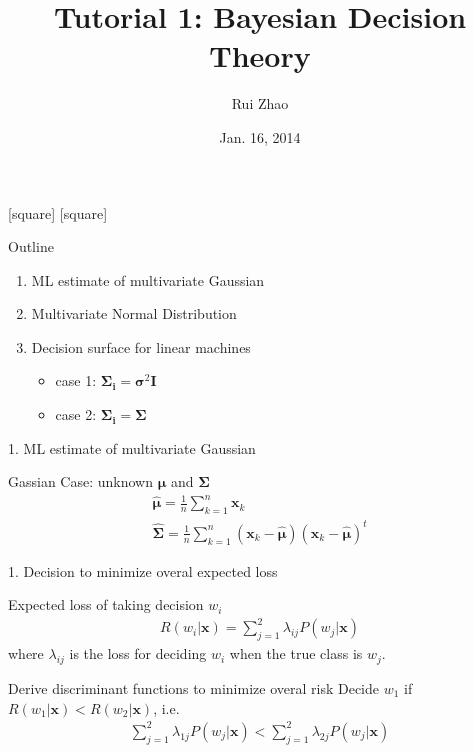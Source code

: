 \documentclass[compress,blue]{beamer}
\title[ENGG 5202 Pattern Recogntion Tutorial 1]{Tutorial 1: Bayesian Decision Theory}
\author{Rui Zhao}
\institute{rzhao@ee.cuhk.edu.hk}
\date{Jan. 16, 2014}
\newcommand{\bx}{\mathbf{x}}
\newcommand{\bmu}{\mathbf{\mu}}
\newcommand{\bSig}{\mathbf{\Sigma}}
\begin{document}
\begin{frame}
\titlepage
\end{frame}

[square]
[square]

\begin{frame}{Outline}
	\begin{enumerate}
		\item<1-> ML estimate of multivariate Gaussian 
		\vspace{0.1in}
		\item<2-> Multivariate Normal Distribution
		\vspace{0.1in}
		\item<3-> Decision surface for linear machines
		\begin{itemize}
			\item case 1: $\mathbf{\Sigma_i} = \mathbf{\sigma}^2\mathbf{I}$
			\item case 2: $\mathbf{\Sigma_i} = \mathbf{\Sigma}$
		\end{itemize}
	\end{enumerate}
\end{frame}

\begin{frame}{1. ML estimate of multivariate Gaussian}
	\begin{block}{Gassian Case: unknown $\bmu$ and $\bSig$}
		\begin{align}
			\hat{\bmu} = \frac{1}{n}\sum_{k=1}^n\bx_k\\
			\hat{\bSig} = \frac{1}{n}\sum_{k=1}^n(\bx_k - \hat{\bmu})(\bx_k - \hat{\bmu})^t
		\end{align}
	\end{block}
\end{frame}

\begin{frame}{1. Decision to minimize overal expected loss}
	\begin{block}{Expected loss of taking decision $w_i$}
		\vspace{-0.15in}
		\begin{align}
			R(w_i|\mathbf{x}) = \sum_{j=1}^2 \lambda_{ij} P(w_j | \mathbf{x})
		\end{align}
		where $\lambda_{ij}$ is the loss for deciding $w_i$ when the true class is $w_j$.
	\end{block}
	\pause
	\begin{block}{Derive discriminant functions to minimize overal risk}
		Decide $w_1$ if $R(w_1 | \mathbf{x}) < R(w_2 | \mathbf{x})$, i.e.
		\begin{align}
			\sum_{j=1}^2 \lambda_{1j} P(w_j | \mathbf{x}) < \sum_{j=1}^2 \lambda_{2j} P(w_j | \mathbf{x})
		\end{align}
	\end{block}
\end{frame}
\end{document}
